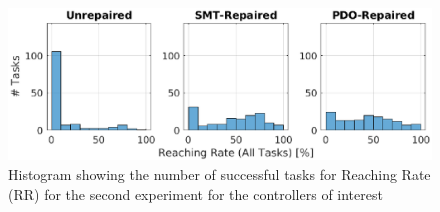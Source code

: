\begin{figure}[H]
    \centering
    \includegraphics[width=\textwidth]{Images/second-experiment/exp1_RR_all_hist.eps}
    \caption{Histogram showing the number of successful tasks for Reaching Rate (RR) for the second experiment for the controllers of interest}
    \label{fig:hist-RR-all-second}
\end{figure}
%
%
%
%
%
